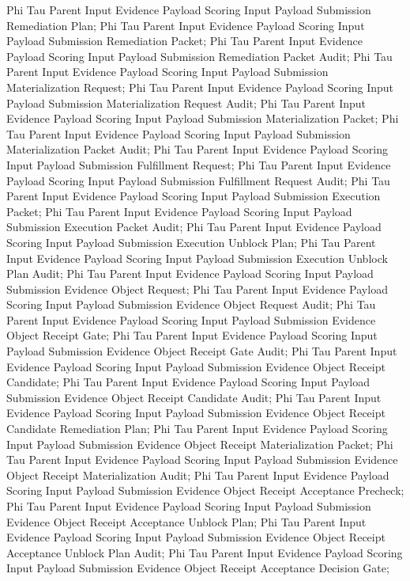 \documentclass[11pt]{article}
\begin{document}
Phi Tau Parent Input Evidence Payload Scoring Input Payload Submission Remediation Plan;
Phi Tau Parent Input Evidence Payload Scoring Input Payload Submission Remediation Packet;
Phi Tau Parent Input Evidence Payload Scoring Input Payload Submission Remediation Packet Audit;
Phi Tau Parent Input Evidence Payload Scoring Input Payload Submission Materialization Request;
Phi Tau Parent Input Evidence Payload Scoring Input Payload Submission Materialization Request Audit;
Phi Tau Parent Input Evidence Payload Scoring Input Payload Submission Materialization Packet;
Phi Tau Parent Input Evidence Payload Scoring Input Payload Submission Materialization Packet Audit;
Phi Tau Parent Input Evidence Payload Scoring Input Payload Submission Fulfillment Request;
Phi Tau Parent Input Evidence Payload Scoring Input Payload Submission Fulfillment Request Audit;
Phi Tau Parent Input Evidence Payload Scoring Input Payload Submission Execution Packet;
Phi Tau Parent Input Evidence Payload Scoring Input Payload Submission Execution Packet Audit;
Phi Tau Parent Input Evidence Payload Scoring Input Payload Submission Execution Unblock Plan;
Phi Tau Parent Input Evidence Payload Scoring Input Payload Submission Execution Unblock Plan Audit;
Phi Tau Parent Input Evidence Payload Scoring Input Payload Submission Evidence Object Request;
Phi Tau Parent Input Evidence Payload Scoring Input Payload Submission Evidence Object Request Audit;
Phi Tau Parent Input Evidence Payload Scoring Input Payload Submission Evidence Object Receipt Gate;
Phi Tau Parent Input Evidence Payload Scoring Input Payload Submission Evidence Object Receipt Gate Audit;
Phi Tau Parent Input Evidence Payload Scoring Input Payload Submission Evidence Object Receipt Candidate;
Phi Tau Parent Input Evidence Payload Scoring Input Payload Submission Evidence Object Receipt Candidate Audit;
Phi Tau Parent Input Evidence Payload Scoring Input Payload Submission Evidence Object Receipt Candidate Remediation Plan;
Phi Tau Parent Input Evidence Payload Scoring Input Payload Submission Evidence Object Receipt Materialization Packet;
Phi Tau Parent Input Evidence Payload Scoring Input Payload Submission Evidence Object Receipt Materialization Audit;
Phi Tau Parent Input Evidence Payload Scoring Input Payload Submission Evidence Object Receipt Acceptance Precheck;
Phi Tau Parent Input Evidence Payload Scoring Input Payload Submission Evidence Object Receipt Acceptance Unblock Plan;
Phi Tau Parent Input Evidence Payload Scoring Input Payload Submission Evidence Object Receipt Acceptance Unblock Plan Audit;
Phi Tau Parent Input Evidence Payload Scoring Input Payload Submission Evidence Object Receipt Acceptance Decision Gate;
\end{document}
